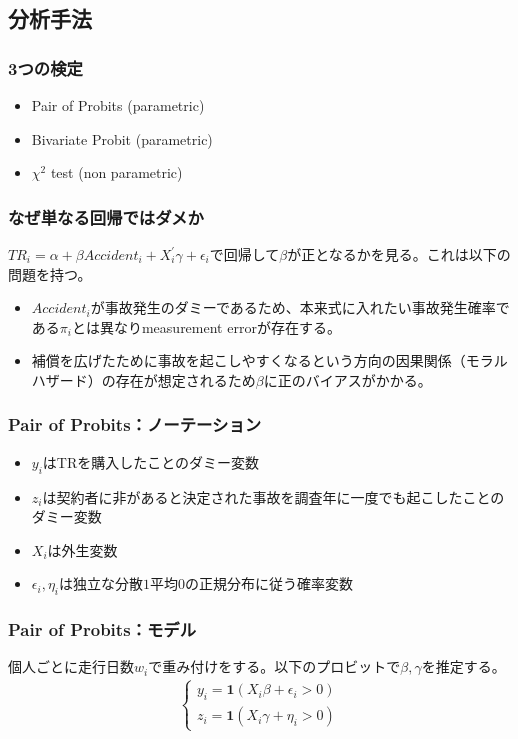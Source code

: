 \documentclass[dvipdfmx, 12pt]{beamer}
\begin{document}
\subsection{分析手法}
\begin{frame}\frametitle{3つの検定}
	\begin{itemize}
	\item Pair of Probits (parametric)
	\item Bivariate Probit (parametric)
	\item $\chi^2$ test (non parametric)
	\end{itemize}
\end{frame}

\begin{frame}\frametitle{なぜ単なる回帰ではダメか}
$TR_i = \alpha + \beta Accident_i + X_i^{'}\gamma + \epsilon_i$で回帰して$\beta$が正となるかを見る。これは以下の問題を持つ。
	\begin{itemize}
	\item $Accident_i$が事故発生のダミーであるため、本来式に入れたい事故発生確率である$\pi_i$とは異なりmeasurement errorが存在する。
	\item 補償を広げたために事故を起こしやすくなるという方向の因果関係（モラルハザード）の存在が想定されるため$\beta$に正のバイアスがかかる。
	\end{itemize}
\end{frame}

\begin{frame}\frametitle{Pair of Probits：ノーテーション}
	\begin{itemize}
	\item $y_i$はTRを購入したことのダミー変数
	\item $z_i$は契約者に非があると決定された事故を調査年に一度でも起こしたことのダミー変数
	\item $X_i$は外生変数
	\item $\epsilon_i, \eta_i$は独立な分散$1$平均$0$の正規分布に従う確率変数
	\end{itemize}
\end{frame}

\begin{frame}\frametitle{Pair of Probits：モデル}
個人ごとに走行日数$w_i$で重み付けをする。以下のプロビットで$\beta, \gamma$を推定する。
	\begin{align*}
	\begin{cases}
	y_i = {\bm 1}(X_i \beta + \epsilon_i > 0)\\[8pt]
	z_i = {\bm 1}(X_i \gamma + \eta_i > 0)
	\end{cases}
	\end{align*}
\end{frame}
\end{document}

